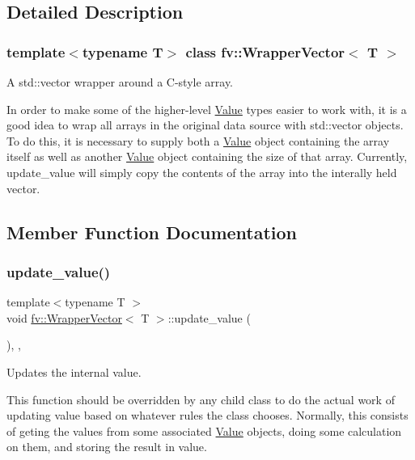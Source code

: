 \subsection{Detailed Description}
\subsubsection*{template$<$typename T$>$\newline
class fv\+::\+Wrapper\+Vector$<$ T $>$}

A std\+::vector wrapper around a C-\/style array. 

In order to make some of the higher-\/level \hyperlink{classfv_1_1Value}{Value} types easier to work with, it is a good idea to wrap all arrays in the original data source with std\+::vector objects. To do this, it is necessary to supply both a \hyperlink{classfv_1_1Value}{Value} object containing the array itself as well as another \hyperlink{classfv_1_1Value}{Value} object containing the size of that array. Currently, update\+\_\+value will simply copy the contents of the array into the interally held vector. 

\subsection{Member Function Documentation}
\hypertarget{classfv_1_1WrapperVector_a2ee99bc4425642d209df7b48ee2ada95}{}\label{classfv_1_1WrapperVector_a2ee99bc4425642d209df7b48ee2ada95} 
\subsubsection{\texorpdfstring{update\+\_\+value()}{update\_value()}}
{\footnotesize\ttfamily template$<$typename T $>$ \\
void \hyperlink{classfv_1_1WrapperVector}{fv\+::\+Wrapper\+Vector}$<$ T $>$\+::update\+\_\+value (\begin{DoxyParamCaption}{ }\end{DoxyParamCaption})\hspace{0.3cm}{\ttfamily [inline]}, {\ttfamily [private]}, {\ttfamily [virtual]}}



Updates the internal value. 

This function should be overridden by any child class to do the actual work of updating value based on whatever rules the class chooses. Normally, this consists of geting the values from some associated \hyperlink{classfv_1_1Value}{Value} objects, doing some calculation on them, and storing the result in value. 


